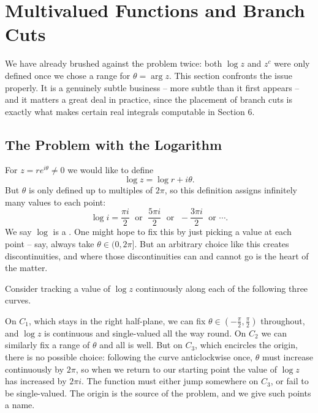 \section{Multivalued Functions and Branch Cuts}

We have already brushed against the problem twice: both $\log z$ and $z^c$ were only defined once we chose a range for $\theta = \arg z$. This section confronts the issue properly. It is a genuinely subtle business -- more subtle than it first appears -- and it matters a great deal in practice, since the placement of branch cuts is exactly what makes certain real integrals computable in Section 6.

\subsection{The Problem with the Logarithm}

For $z = re^{i\theta} \neq 0$ we would like to define
$$
\log z = \log r + i\theta.
$$
But $\theta$ is only defined up to multiples of $2\pi$, so this definition assigns infinitely many values to each point:
$$
\log i = \frac{\pi i}{2} \;\text{ or }\; \frac{5\pi i}{2} \;\text{ or }\; -\frac{3\pi i}{2} \;\text{ or } \cdots.
$$
We say $\log$ is a . One might hope to fix this by just picking a value at each point -- say, always take $\theta \in (0, 2\pi]$. But an arbitrary choice like this creates discontinuities, and where those discontinuities can and cannot go is the heart of the matter.

Consider tracking a value of $\log z$ continuously along each of the following three curves.

\begin{center}
\end{center}

On $C_1$, which stays in the right half-plane, we can fix $\theta \in (-\frac{\pi}{2}, \frac{\pi}{2})$ throughout, and $\log z$ is continuous and single-valued all the way round. On $C_2$ we can similarly fix a range of $\theta$ and all is well. But on $C_3$, which encircles the origin, there is no possible choice: following the curve anticlockwise once, $\theta$ must increase continuously by $2\pi$, so when we return to our starting point the value of $\log z$ has increased by $2\pi i$. The function must either jump somewhere on $C_3$, or fail to be single-valued. The origin is the source of the problem, and we give such points a name.

